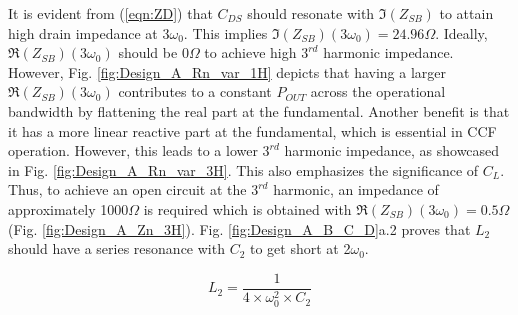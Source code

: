 \documentclass[conference]{IEEEtran}
\begin{document}
It is evident from (\ref{eqn:ZD}) that $C_{DS}$ should resonate with $\Im(Z_{SB})$ to attain high drain impedance at $3\omega_0$. This implies $\Im(Z_{SB})(3\omega_0) = 24.96\Omega$. Ideally, $\Re(Z_{SB})(3\omega_0)$ should be $0\Omega$ to achieve high $3^{rd}$ harmonic impedance. However, Fig. \ref{fig:Design_A_Rn_var_1H} depicts that having a larger $\Re(Z_{SB})(3\omega_0)$ contributes to a constant $P_{OUT}$ across the operational bandwidth by flattening the real part at the fundamental. Another benefit is that it has a  more linear reactive part at the fundamental, which is essential in CCF operation.
However, this leads to a lower $3^{rd}$ harmonic impedance, as showcased in Fig. \ref{fig:Design_A_Rn_var_3H}. This also emphasizes  the significance of $C_L$. Thus, to achieve an open circuit at the $3^{rd}$ harmonic, an impedance of approximately 1000$\Omega$ is required which is obtained with  $\Re(Z_{SB})(3\omega_0) = 0.5\Omega$ (Fig. \ref{fig:Design_A_Zn_3H}). Fig. \ref{fig:Design_A_B_C_D}a.2 proves that $L_2$ should have a series resonance with $C_2$ to get short at 2$\omega_0$.

\vspace{-0.05in}
\begin{equation}
    L_2=\frac{1}{4\times\omega_0^2\times C_2}%
    \label{eqn:Design_A_2H}
\end{equation}
\end{document}
